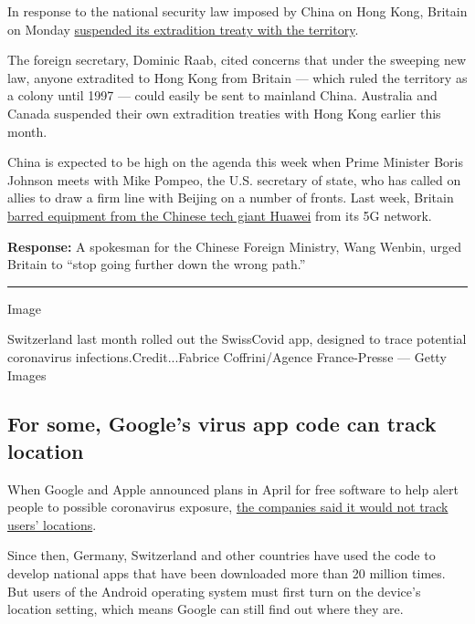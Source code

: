 In response to the national security law imposed by China on Hong Kong,
Britain on Monday
\href{https://www.nytimes.com/2020/07/20/world/extradition-treaty-hong-kong.html}{suspended
its extradition treaty with the territory}.

The foreign secretary, Dominic Raab, cited concerns that under the
sweeping new law, anyone extradited to Hong Kong from Britain --- which
ruled the territory as a colony until 1997 --- could easily be sent to
mainland China. Australia and Canada suspended their own extradition
treaties with Hong Kong earlier this month.

China is expected to be high on the agenda this week when Prime Minister
Boris Johnson meets with Mike Pompeo, the U.S. secretary of state, who
has called on allies to draw a firm line with Beijing on a number of
fronts. Last week, Britain
\href{https://www.nytimes.com/2020/07/14/business/huawei-uk-5g.html?searchResultPosition=1}{barred
equipment from the Chinese tech giant Huawei} from its 5G network.

\textbf{Response:} A spokesman for the Chinese Foreign Ministry, Wang
Wenbin, urged Britain to ``stop going further down the wrong path.''

\begin{center}\rule{0.5\linewidth}{\linethickness}\end{center}

Image

Switzerland last month rolled out the SwissCovid app, designed to trace
potential coronavirus infections.Credit...Fabrice Coffrini/Agence
France-Presse --- Getty Images

\hypertarget{for-some-googles-virus-app-code-can-track-location}{%
\subsection{For some, Google's virus app code can track
location}\label{for-some-googles-virus-app-code-can-track-location}}

When Google and Apple announced plans in April for free software to help
alert people to possible coronavirus exposure,
\href{https://www.nytimes.com/2020/07/20/technology/google-covid-tracker-app.html}{the
companies said it would not track users' locations}.

Since then, Germany, Switzerland and other countries have used the code
to develop national apps that have been downloaded more than 20 million
times. But users of the Android operating system must first turn on the
device's location setting, which means Google can still find out where
they are.

